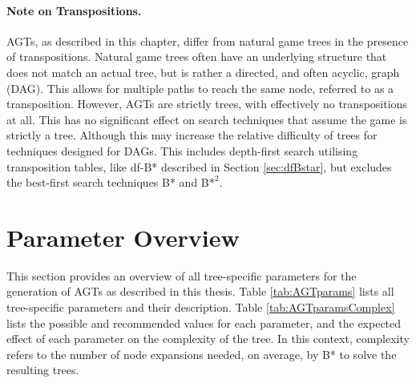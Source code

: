 \paragraph{Note on Transpositions.}
AGTs, as described in this chapter, differ from natural game trees in the presence of transpositions. Natural game trees often have an underlying structure that does not match an actual tree, but is rather a directed, and often acyclic, graph (DAG). This allows for multiple paths to reach the same node, referred to as a transposition. However, AGTs are strictly trees, with effectively no transpositions at all. This has no significant effect on search techniques that assume the game is strictly a tree. Although this may increase the relative difficulty of trees for techniques designed for DAGs. This includes depth-first search utilising transposition tables, like df-B* described in Section \ref{sec:dfBstar}, but excludes the best-first search techniques B* and ${\text{B*}}^2$.

\newpage
\section{Parameter Overview}
\label{sec:AGTparams}
This section provides an overview of all tree-specific parameters for the generation of AGTs as described in this thesis. Table \ref{tab:AGTparams} lists all tree-specific parameters and their description. Table \ref{tab:AGTparamsComplex} lists the possible and recommended values for each parameter, and the expected effect of each parameter on the complexity of the tree. In this context, complexity refers to the number of node expansions needed, on average, by B* to solve the resulting trees.

